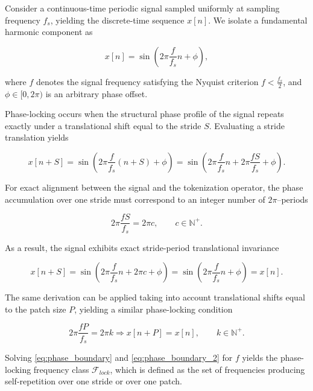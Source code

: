 Consider a continuous-time periodic signal sampled uniformly at sampling frequency $f_s$, yielding the discrete-time sequence $x[n]$. We isolate a fundamental harmonic component as

\begin{equation}
\label{eq:sinusoid}
x[n]
=
\sin\!\left(
2\pi\frac{f}{f_s}n+\phi
\right),
\end{equation}

where $f$ denotes the signal frequency satisfying the Nyquist criterion $f < \frac{f_s}{2}$, and $\phi\in[0,2\pi)$ is an arbitrary phase offset.

Phase-locking occurs when the structural phase profile of the signal repeats exactly under a translational shift equal to the stride $S$. Evaluating a stride translation yields

\begin{equation}
\label{eq:stride_translation}
x[n+S]
=
\sin\!\left(
2\pi\frac{f}{f_s}(n+S)+\phi
\right)
=
\sin\!\left(
2\pi\frac{f}{f_s}n
+
2\pi\frac{fS}{f_s}
+
\phi
\right).
\end{equation}

For exact alignment between the signal and the tokenization operator, the phase accumulation over one stride must correspond to an integer number of $2\pi$--periods

\begin{equation}
\label{eq:phase_boundary}
2\pi\frac{fS}{f_s}
=
2\pi c,
\qquad
c\in\mathbb{N}^{+}.
\end{equation}

As a result, the signal exhibits exact stride-period translational invariance

\begin{equation}
\label{eq:stride_translation_invariance}
x[n+S]
=
\sin\!\left(
2\pi\frac{f}{f_s}n
+
2\pi c
+
\phi
\right)
=
\sin\!\left(
2\pi\frac{f}{f_s}n
+\phi
\right)
=
x[n].
\end{equation}

The same derivation can be applied taking into account translational shifts equal to the patch size $P$, yielding a similar phase-locking condition

\begin{equation}
\label{eq:phase_boundary_2}
2\pi\frac{fP}{f_s}
=
2\pi k
\Rightarrow
x[n+P]
=
x[n],
\qquad
k\in\mathbb{N}^{+}.
\end{equation}

Solving \autoref{eq:phase_boundary} and \autoref{eq:phase_boundary_2} for $f$ yields the phase-locking frequency class $\mathcal{F}_{lock}$, which is defined as the set of frequencies producing self-repetition over one stride or over one patch.

